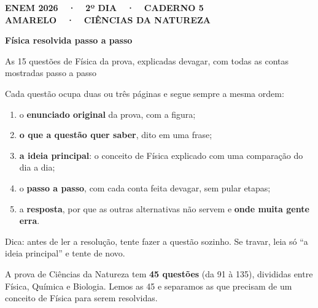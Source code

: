 \thispagestyle{fancy}
\renewcommand{\nomecap}{Raio-X da prova}
\begin{tcolorbox}[enhanced,colback=tinta,colframe=tinta,arc=3mm,boxrule=0pt,left=6mm,right=6mm,top=5mm,bottom=5mm,halign=flush left]
  {\color{white}\small\bfseries ENEM 2026\ \ ·\ \ 2º DIA\ \ ·\ \ CADERNO 5 AMARELO\ \ ·\ \ CIÊNCIAS DA NATUREZA\par}\vspace{1.5mm}
  {\color{white}\fontsize{27}{30}\selectfont\bfseries Física resolvida passo a passo\par}\vspace{1.5mm}
  {\color{white}\large As 15 questões de Física da prova, explicadas devagar, com todas as contas mostradas passo a passo\par}
\end{tcolorbox}

Cada questão ocupa duas ou três páginas e segue sempre a mesma ordem:
\begin{enumerate}[label=\protect\selo{\arabic*},leftmargin=2em,itemsep=1.5pt]
  \item o \textbf{enunciado original} da prova, com a figura;
  \item \textbf{o que a questão quer saber}, dito em uma frase;
  \item \textbf{a ideia principal}: o conceito de Física explicado com uma comparação do dia a dia;
  \item o \textbf{passo a passo}, com cada conta feita devagar, sem pular etapas;
  \item a \textbf{resposta}, por que as outras alternativas não servem e \textbf{onde muita gente erra}.
\end{enumerate}
Dica: antes de ler a resolução, tente fazer a questão sozinho. Se travar, leia só ``a ideia principal'' e tente de novo.


A prova de Ciências da Natureza tem \textbf{45 questões} (da 91 à 135), divididas entre Física, Química e Biologia.
Lemos as 45 e separamos as que precisam de um conceito de Física para serem resolvidas.

